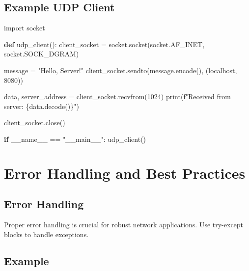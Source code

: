 \documentclass[
  letterpaper,
  DIV=11,
  numbers=noendperiod]{scrreprt}
\newenvironment{Shaded}{\begin{snugshade}}{\end{snugshade}}
\newcommand{\BuiltInTok}[1]{\textcolor[rgb]{0.00,0.23,0.31}{#1}}
\newcommand{\ControlFlowTok}[1]{\textcolor[rgb]{0.00,0.23,0.31}{\textbf{#1}}}
\newcommand{\DecValTok}[1]{\textcolor[rgb]{0.68,0.00,0.00}{#1}}
\newcommand{\ImportTok}[1]{\textcolor[rgb]{0.00,0.46,0.62}{#1}}
\newcommand{\KeywordTok}[1]{\textcolor[rgb]{0.00,0.23,0.31}{\textbf{#1}}}
\newcommand{\NormalTok}[1]{\textcolor[rgb]{0.00,0.23,0.31}{#1}}
\newcommand{\OperatorTok}[1]{\textcolor[rgb]{0.37,0.37,0.37}{#1}}
\newcommand{\SpecialCharTok}[1]{\textcolor[rgb]{0.37,0.37,0.37}{#1}}
\newcommand{\SpecialStringTok}[1]{\textcolor[rgb]{0.13,0.47,0.30}{#1}}
\newcommand{\StringTok}[1]{\textcolor[rgb]{0.13,0.47,0.30}{#1}}
\newcommand{\VariableTok}[1]{\textcolor[rgb]{0.07,0.07,0.07}{#1}}
\begin{document}
\subsection{Example UDP Client}\label{example-udp-client-1}

\begin{Shaded}
\begin{Highlighting}[]
\ImportTok{import}\NormalTok{ socket}

\KeywordTok{def}\NormalTok{ udp\_client():}
\NormalTok{    client\_socket }\OperatorTok{=}\NormalTok{ socket.socket(socket.AF\_INET, socket.SOCK\_DGRAM)}

\NormalTok{    message }\OperatorTok{=} \StringTok{"Hello, Server!"}
\NormalTok{    client\_socket.sendto(message.encode(), (}\StringTok{\textquotesingle{}localhost\textquotesingle{}}\NormalTok{, }\DecValTok{8080}\NormalTok{))}

\NormalTok{    data, server\_address }\OperatorTok{=}\NormalTok{ client\_socket.recvfrom(}\DecValTok{1024}\NormalTok{)}
    \BuiltInTok{print}\NormalTok{(}\SpecialStringTok{f"Received from server: }\SpecialCharTok{\{}\NormalTok{data}\SpecialCharTok{.}\NormalTok{decode()}\SpecialCharTok{\}}\SpecialStringTok{"}\NormalTok{)}

\NormalTok{    client\_socket.close()}

\ControlFlowTok{if} \VariableTok{\_\_name\_\_} \OperatorTok{==} \StringTok{"\_\_main\_\_"}\NormalTok{:}
\NormalTok{    udp\_client()}
\end{Highlighting}
\end{Shaded}

\section{Error Handling and Best
Practices}\label{error-handling-and-best-practices}

\subsection{Error Handling}\label{error-handling-3}

Proper error handling is crucial for robust network applications. Use
try-except blocks to handle exceptions.

\subsection{Example}\label{example-33}
\end{document}
